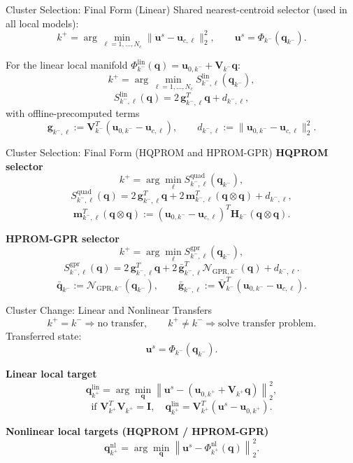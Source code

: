 \documentclass{beamer}
\begin{document}
\begin{frame}{Cluster Selection: Final Form (Linear)}
\small
Shared nearest-centroid selector (used in all local models):
\[
k^+=\arg\min_{\ell=1,\dots,N_c}\|\mathbf u^s-\mathbf u_{c,\ell}\|_2^2,
\qquad
\mathbf u^s=\Phi_{k^-}(\mathbf q_{k^-}).
\]

\vspace{0.2em}
For the linear local manifold $\Phi_{k^-}^{\mathrm{lin}}(\mathbf q)=\mathbf u_{0,k^-}+\mathbf V_{k^-}\mathbf q$:
\[
k^+=\arg\min_{\ell=1,\dots,N_c} S_{k^-,\ell}^{\mathrm{lin}}(\mathbf q_{k^-}),
\]
\[
S_{k^-,\ell}^{\mathrm{lin}}(\mathbf q)
=
2\,\mathbf g_{k^-,\ell}^T\mathbf q + d_{k^-,\ell},
\]
with offline-precomputed terms
\[
\mathbf g_{k^-,\ell}
:=
\mathbf V_{k^-}^T(\mathbf u_{0,k^-}-\mathbf u_{c,\ell}),
\qquad
d_{k^-,\ell}
:=
\|\mathbf u_{0,k^-}-\mathbf u_{c,\ell}\|_2^2.
\]
\end{frame}

\begin{frame}{Cluster Selection: Final Form (HQPROM and HPROM-GPR)}
\scriptsize
\textbf{HQPROM selector}
\[
k^+=\arg\min_{\ell} S_{k^-,\ell}^{\mathrm{quad}}(\mathbf q_{k^-}),
\]
\[
S_{k^-,\ell}^{\mathrm{quad}}(\mathbf q)
=
2\,\mathbf g_{k^-,\ell}^T\mathbf q
+
2\,\mathbf m_{k^-,\ell}^T(\mathbf q\otimes\mathbf q)
+
d_{k^-,\ell},
\]
\[
\mathbf m_{k^-,\ell}^T(\mathbf q\otimes\mathbf q)
:=
(\mathbf u_{0,k^-}-\mathbf u_{c,\ell})^T\mathbf H_{k^-}(\mathbf q\otimes\mathbf q).
\]

\vspace{0.35em}
\textbf{HPROM-GPR selector}
\[
k^+=\arg\min_{\ell} S_{k^-,\ell}^{\mathrm{gpr}}(\mathbf q_{k^-}),
\]
\[
S_{k^-,\ell}^{\mathrm{gpr}}(\mathbf q)
=
2\,\mathbf g_{k^-,\ell}^T\mathbf q
+
2\,\bar{\mathbf g}_{k^-,\ell}^T\mathcal N_{\mathrm{GPR},k^-}(\mathbf q)
+
d_{k^-,\ell}.
\]
\[
\bar{\mathbf q}_{k^-}:=\mathcal N_{\mathrm{GPR},k^-}(\mathbf q_{k^-}),
\qquad
\bar{\mathbf g}_{k^-,\ell}:=\bar{\mathbf V}_{k^-}^T(\mathbf u_{0,k^-}-\mathbf u_{c,\ell}).
\]
\end{frame}

\begin{frame}{Cluster Change: Linear and Nonlinear Transfers}
\scriptsize
\[
k^+=k^- \Rightarrow \text{no transfer},
\qquad
k^+\neq k^- \Rightarrow \text{solve transfer problem}.
\]
Transferred state:
\[
\mathbf u^s=\Phi_{k^-}(\mathbf q_{k^-}).
\]

\textbf{Linear local target}
\[
\mathbf q_{k^+}^{\mathrm{lin}}
=\arg\min_{\mathbf q}
\left\|
\mathbf u^s-\left(\mathbf u_{0,k^+}+\mathbf V_{k^+}\mathbf q\right)
\right\|_2^2,
\]
\[
\text{if }\mathbf V_{k^+}^T\mathbf V_{k^+}=\mathbf I,\quad
\mathbf q_{k^+}^{\mathrm{lin}}=\mathbf V_{k^+}^T(\mathbf u^s-\mathbf u_{0,k^+}).
\]

\textbf{Nonlinear local targets (HQPROM / HPROM-GPR)}
\[
\mathbf q_{k^+}^{\mathrm{nl}}
=\arg\min_{\mathbf q}
\left\|\mathbf u^s-\Phi_{k^+}^{\mathrm{nl}}(\mathbf q)\right\|_2^2.
\]
\end{frame}
\end{document}
